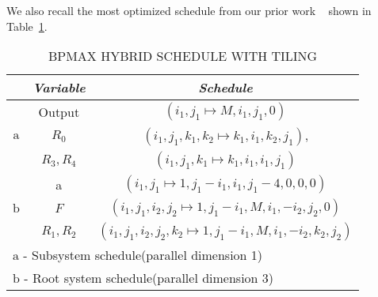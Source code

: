 We also recall the most optimized schedule from our prior work ~\cite{Mondal2021} shown in Table~\ref{tab:hybrid_schedule_with_tiling}.


\begin{table}[htbp]
\caption{\uppercase{BPMax hybrid schedule with tiling}}
\begin{center}
\begin{tabular}{|c|c|c|}
\hline
\textbf{} & \textbf{\textit{Variable}}& \textbf{\textit{Schedule}} \\
\hline
 &  Output & $(i_{1},j_{1} \mapsto M, i_{1}, j_{1}, 0)$ \\
 \cline{2-3} 
${\mathrm{a}}$ & $R_{0}$ & $(i_{1},j_{1},k_{1},k_{2} \mapsto k_{1}, i_{1}, k_{2}, j_{1})$,    \\
\cline{2-3} 
& $R_{3}, R_{4}$ & $(i_{1},j_{1},k_{1} \mapsto k_{1}, i_{1}, i_{1}, j_{1})$    \\
\hline
& a & $(i_{1},j_{1} \mapsto 1, j_{1}-i_{1}, i_{1}, j_{1}-4, 0, 0, 0)$   \\
\cline{2-3} 
${\mathrm{b}}$ & $F$ & $(i_{1},j_{1},i_{2},j_{2} \mapsto 1, j_{1}-i_{1}, M, i_{1}, -i_{2}, j_{2}, 0)$   \\
\cline{2-3} 
& $R_{1}, R_{2}$ & $(i_{1},j_{1},i_{2},j_{2},k_{2} \mapsto 1, j_{1}-i_{1}, M, i_{1}, -i_{2}, k_{2}, j_{2})$  \\
\hline
\multicolumn{3}{l}{${\mathrm{a}}$ - Subsystem schedule(parallel dimension 1)}\\
\multicolumn{3}{l}{${\mathrm{b}}$ - Root system schedule(parallel dimension 3)}\\
\end{tabular}
\label{tab:hybrid_schedule_with_tiling}
\end{center}
\end{table}